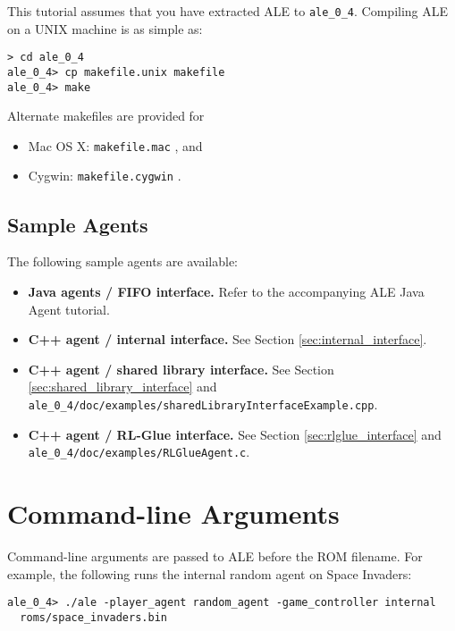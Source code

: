 \documentclass[12pt]{article}
\begin{document}
This tutorial assumes that you have extracted ALE to \verb+ale_0_4+. Compiling
ALE on a UNIX machine is as simple as:

\begin{verbatim}
> cd ale_0_4
ale_0_4> cp makefile.unix makefile
ale_0_4> make
\end{verbatim}

Alternate makefiles are provided for 

\begin{itemize}
  \item{Mac OS X: \verb+makefile.mac+ , and}
  \item{Cygwin: \verb+makefile.cygwin+ .}
\end{itemize}

\subsection{Sample Agents}

The following sample agents are available:

\begin{itemize}
  \item{\textbf{Java agents / FIFO interface.} Refer to the accompanying ALE Java Agent tutorial.}
  \item{\textbf{C++ agent / internal interface.} See Section \ref{sec:internal_interface}.}
  \item{\textbf{C++ agent / shared library interface.} See Section \ref{sec:shared_library_interface} and \\ 
    \verb+ale_0_4/doc/examples/sharedLibraryInterfaceExample.cpp+.}
  \item{\textbf{C++ agent / RL-Glue interface.} See Section \ref{sec:rlglue_interface} and \\
    \verb+ale_0_4/doc/examples/RLGlueAgent.c+.}
\end{itemize}

\section{Command-line Arguments}

Command-line arguments are passed to ALE before the ROM filename. For example, the following runs
the internal random agent on Space Invaders:

\begin{verbatim}
ale_0_4> ./ale -player_agent random_agent -game_controller internal 
  roms/space_invaders.bin
\end{verbatim}
\end{document}
